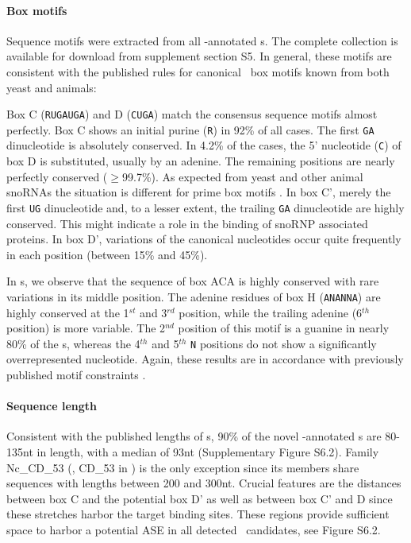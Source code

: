 \paragraph{\textbf{Box motifs}} Sequence motifs were extracted from all
\snostrip-annotated \sno s. The complete collection is available for
download from supplement section S5. In general, these motifs are
consistent with the published rules \cite{Xia:1997, Watkins:2000,
  Cahill:2002, Watkins:2002} for canonical \sno\ box motifs known from both
yeast and animals:

Box C (\texttt{RUGAUGA}) and D (\texttt{CUGA}) match the consensus sequence
motifs almost perfectly. Box C shows an initial purine (\texttt{R}) in 92\%
of all cases.  The first \texttt{GA} dinucleotide is absolutely conserved.
In 4.2\% of the cases, the 5' nucleotide (\texttt{C}) of box D is
substituted, usually by an adenine. The remaining positions are nearly
perfectly conserved ($\ge$99.7\%). As expected from yeast and other animal
snoRNAs the situation is different for prime box motifs
\cite{Cahill:2002,Kiss-László:1998}.  In box C', merely the first
\texttt{UG} dinucleotide and, to a lesser extent, the trailing \texttt{GA}
dinucleotide are highly conserved.  This might indicate a role in the
binding of snoRNP associated proteins.  In box D', variations of the
canonical nucleotides occur quite frequently in each position (between 15\%
and 45\%).

In \haca s, we observe that the sequence of box ACA is highly
conserved with rare variations in its middle position. The adenine
residues of box H (\texttt{ANANNA}) are highly conserved at the
1$^{st}$ and 3$^{rd}$ position, while the trailing adenine (6$^{th}$
position) is more variable. The 2$^{nd}$ position of this motif is a
guanine in nearly 80\% of the \haca s, whereas the 4$^{th}$ and
5$^{th}$ \texttt{N} positions do not show a significantly
overrepresented nucleotide. Again, these results are in accordance
with previously published motif constraints \cite{Normand:2006}.

\paragraph{\textbf{Sequence length}} Consistent with the published
lengths of \cd s, 90\% of the novel \snostrip-annotated \sno s are
80-135nt in length, with a median of 93nt (Supplementary Figure S6.2).
Family Nc\_CD\_53 (\ncr, CD\_53 in \snostrip) is the only exception since
its members share sequences with lengths between 200 and 300nt.  Crucial
features are the distances between box C and the potential box D' as well
as between box C' and D since these stretches harbor the target binding
sites. These regions provide sufficient space to harbor a potential ASE in
all detected \sno\ candidates, see Figure S6.2.

